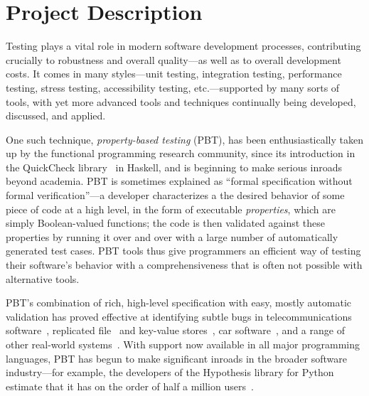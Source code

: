 \section*{Project Description}



\iflater{}\fi

Testing plays a vital role in modern software development processes,
contributing crucially to robustness and overall quality---as well as
to overall development costs.
%
It comes in many styles---unit testing, integration testing,
performance testing, stress testing, accessibility testing,
etc.---supported by many sorts of tools, with yet more advanced tools
and techniques continually being developed, discussed, and applied.

One such technique, {\em property-based testing} (PBT), has been
enthusiastically taken up by the functional programming research
community, since its introduction in the QuickCheck
library~\cite{ClaessenHughes00} in Haskell, and is beginning to make
serious inroads beyond academia.
%
PBT is sometimes explained as ``formal specification without formal
verification''---a developer characterizes a the desired behavior of
some piece of code at a high level, in the form of executable {\em
  properties}, which are simply Boolean-valued functions; the code is
then validated against these properties by running it over and over
with a large number of automatically generated test cases.
%
PBT tools thus give programmers an efficient way of testing their
software's behavior with a comprehensiveness that is often not
possible with alternative tools.

PBT's combination of rich, high-level specification with easy, mostly
automatic validation has proved effective at identifying subtle
bugs in telecommunications software~\cite{arts2006testing}, replicated
file~\cite{hughes2014mysteries} and key-value
stores~\cite{Bornholt2021}, car software~\cite{arts2015testing}, and a range
of other real-world systems~\cite{hughes2016experiences}. With support
now available in all major programming languages, PBT has
begun to make significant inroads in the broader software
industry---for example, the developers of the Hypothesis library for
Python estimate that it has on the order of half a million
users~\cite{ZacPersonalCommunication}.

